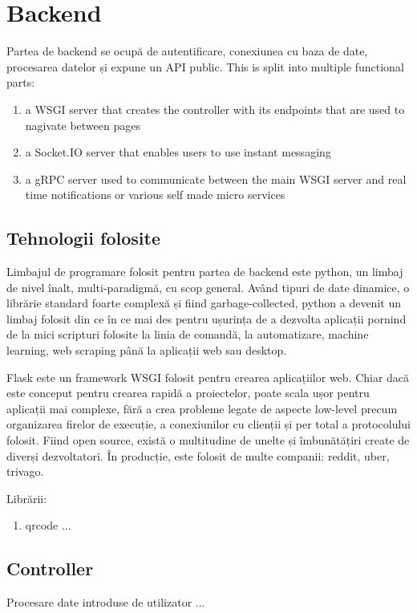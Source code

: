     \section{Backend}
    \label{Backend}
    Partea de backend se ocupă de autentificare, conexiunea cu baza de date, procesarea datelor și expune un API public. This is split into multiple functional parts:
    \begin{enumerate}[noitemsep, label=\textbullet, leftmargin=0.3cm]
        \item a WSGI server that creates the controller with its endpoints that are used to nagivate between pages
        \item a Socket.IO server that enables users to use instant messaging
        \item a gRPC server used to communicate between the main WSGI server and real time notifications or various self made micro services
    \end{enumerate}

    
    \subsection{Tehnologii folosite}
    \label{Backend-tehnologii}
    Limbajul de programare folosit pentru partea de backend este python, un limbaj de nivel înalt, multi-paradigmă, cu scop general. Având tipuri de date dinamice, o librărie standard foarte complexă și fiind garbage-collected, python a devenit un limbaj folosit din ce în ce mai des pentru ușurința de a dezvolta aplicații pornind de la mici scripturi folosite la linia de comandă, la automatizare, machine learning, web scraping până la aplicații web sau desktop. 

    Flask este un framework WSGI folosit pentru crearea aplicațiilor web. Chiar dacă este conceput pentru crearea rapidă a proiectelor, poate scala ușor pentru aplicații mai complexe, fără a crea probleme legate de aspecte low-level precum organizarea firelor de execuție, a conexiunilor cu clienții și per total a protocolului folosit. Fiind open source, există o multitudine de unelte și îmbunătățiri create de diverși dezvoltatori. În producție, este folosit de multe companii: reddit, uber, trivago.

    Librării:
    \begin{enumerate}[noitemsep]
        \item qrcode ...
    \end{enumerate}

    \subsection{Controller}
    \label{Controller}
    Procesare date introduse de utilizator ...

